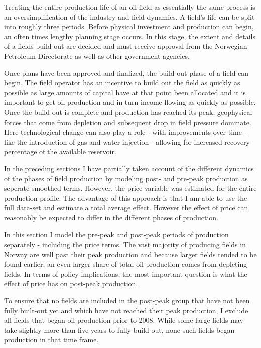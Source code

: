 \documentclass[11pt]{article}
\begin{document}
Treating the entire production life of an oil field as essentially the same process is an oversimplification of the industry and field dynamics.  A field's life can be split into roughly three periods.  Before physical investment and production can begin, an often times lengthy planning stage occurs.  In this stage, the extent and details of a fields build-out are decided and must receive approval from the Norwegian Petroleum Directorate as well as other government agencies.  

Once plans have been approved and finalized, the build-out phase of a field can begin.  The field operator has an incentive to build out the field as quickly as possible as large amounts of capital have at that point been allocated and it is important to get oil production and in turn income flowing as quickly as possible.  Once the build-out is complete and production has reached its peak, geophysical forces that come from depletion and subsequent drop in field pressure dominate.  Here technological change can also play a role - with improvements over time - like the introduction of gas and water injection - allowing for increased recovery percentage of the available reservoir. 

In the preceding sections I have partially taken account of the different dynamics of the phases of field production by modeling post- and pre-peak production as seperate smoothed terms.  However, the price variable was estimated for the entire production profile.  The advantage of this approach is that I am able to use the full data-set and estimate a total average effect.  However the effect of price can reasonably be expected to differ in the different phases of production.  

In this section I model the pre-peak and post-peak periods of production separately - including the price terms. The vast majority of producing fields in Norway are well past their peak production and because larger fields tended to be found earlier, an even larger share of total oil production comes from depleting fields.  In terms of policy implications, the most important question is what the effect of price has on post-peak production. 

To ensure that no fields are included in the post-peak group that have not been fully built-out yet and which have not reached their peak production, I exclude all fields that began oil production prior to 2008.  While some large fields may take slightly more than five years to fully build out, none such fields began production in that time frame.
\end{document}
